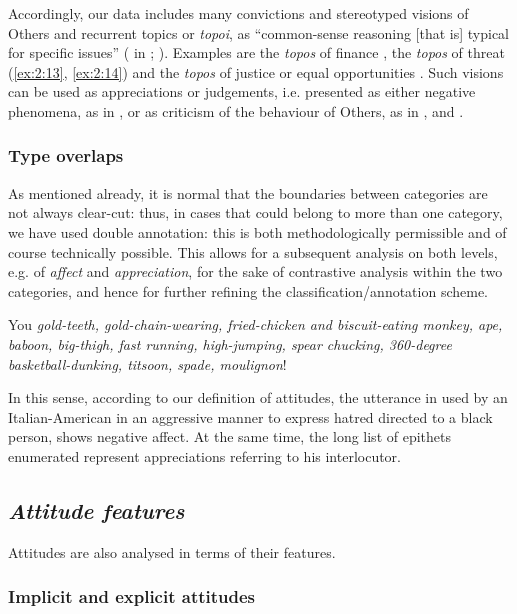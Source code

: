 \documentclass[output=paper]{LSP/langsci}
\begin{document}
Accordingly, our data includes many convictions and stereotyped visions of Others  and recurrent topics or \textit{topoi}, as “common-sense reasoning [that is] typical for specific issues” (\citealt{Dijk2000c} in \citealt[299, note 21]{BakerGabrielatos2008}; \citealt[see also][74–76]{Reisigl2001}). Examples are the \textit{topos} of finance , the \textit{topos} of threat (\ref{ex:2:13}, \ref{ex:2:14}) and the \textit{topos} of justice or equal opportunities . Such visions can be used as appreciations or judgements, i.e. presented as either negative phenomena, as in , or as criticism of the behaviour of Others, as in ,  and .


\subsubsection{Type overlaps}

As mentioned already, it is normal that the boundaries between categories are not always clear-cut: thus, in cases that could belong to more than one category, we have used double annotation: this is both methodologically permissible and of course technically possible. This allows for a subsequent analysis on both levels, e.g. of \textit{affect} and \textit{appreciation}, for the sake of contrastive analysis within the two categories, and hence for further refining the classification/annotation scheme.\newline

\ea \label{ex:2:17} You \emph{gold-teeth, gold-chain-wearing, fried-chicken and biscuit-eating monkey, ape, baboon, big-thigh, fast running, high-jumping, spear chucking, 360-degree basketball-dunking, titsoon, spade, moulignon}!
\z

In this sense, according to our definition of attitudes, the utterance in  used by an Italian-American in an aggressive manner to express hatred directed to a black person, shows negative affect. At the same time, the long list of epithets enumerated represent appreciations referring to his interlocutor.

\subsection{\textit{Attitude features}} \label{sec:2:4:3}

Attitudes are also analysed in terms of their features.

\subsubsection{Implicit and explicit attitudes} 
\end{document}

